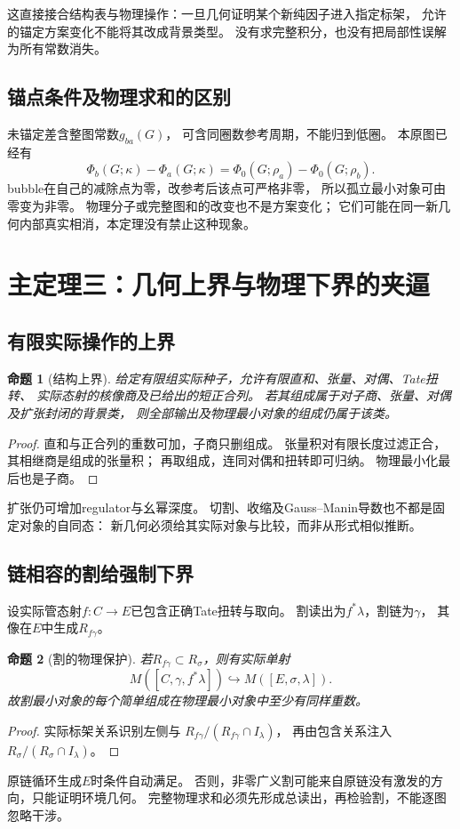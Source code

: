 \documentclass[11pt,a4paper]{ctexart}
\theoremstyle{cnplain}\newtheorem{theorem}{定理}[section]
\newtheorem{proposition}[theorem]{命题}
\theoremstyle{definition}\newtheorem{definition}[theorem]{定义}
\theoremstyle{remark}\newtheorem{remark}[theorem]{注}
\begin{document}
这直接接合结构表与物理操作：一旦几何证明某个新纯因子进入指定标架，
允许的锚定方案变化不能将其改成背景类型。
没有求完整积分，也没有把局部性误解为所有常数消失。

\subsection{锚点条件及物理求和的区别}
未锚定差含整图常数$g_{ba}(G)$，
可含同圈数参考周期，不能归到低圈。
本原图已经有
\[
 \Phi_b(G;\kappa)-\Phi_a(G;\kappa)
 =\Phi_0(G;\rho_a)-\Phi_0(G;\rho_b).
\]
bubble在自己的减除点为零，改参考后该点可严格非零，
所以孤立最小对象可由零变为非零。
物理分子或完整图和的改变也不是方案变化；
它们可能在同一新几何内部真实相消，本定理没有禁止这种现象。

\section{主定理三：几何上界与物理下界的夹逼}
\subsection{有限实际操作的上界}
\begin{proposition}[结构上界]\label{prop:upper}
给定有限组实际种子，允许有限直和、张量、对偶、Tate扭转、
实际态射的核像商及已给出的短正合列。
若其组成属于对子商、张量、对偶及扩张封闭的背景类，
则全部输出及物理最小对象的组成仍属于该类。
\end{proposition}
\begin{proof}
直和与正合列的重数可加，子商只删组成。
张量积对有限长度过滤正合，其相继商是组成的张量积；
再取组成，连同对偶和扭转即可归纳。
物理最小化最后也是子商。
\end{proof}
扩张仍可增加regulator与幺幂深度。
切割、收缩及Gauss--Manin导数也不都是固定对象的自同态：
新几何必须给其实际对象与比较，而非从形式相似推断。

\subsection{链相容的割给强制下界}
设实际管态射$f:C\to E$已包含正确Tate扭转与取向。
割读出为$f^*\lambda$，割链为$\gamma$，
其像在$E$中生成$R_{f\gamma}$。
\begin{proposition}[割的物理保护]\label{prop:lower}
若$R_{f\gamma}\subset R_\sigma$，则有实际单射
\[
 M([C,\gamma,f^*\lambda])\hookrightarrow M([E,\sigma,\lambda]).
\]
故割最小对象的每个简单组成在物理最小对象中至少有同样重数。
\end{proposition}
\begin{proof}
实际标架关系识别左侧与
$R_{f\gamma}/(R_{f\gamma}\cap I_\lambda)$，
再由包含关系注入$R_\sigma/(R_\sigma\cap I_\lambda)$。
\end{proof}
原链循环生成$E$时条件自动满足。
否则，非零广义割可能来自原链没有激发的方向，只能证明环境几何。
完整物理求和必须先形成总读出，再检验割，不能逐图忽略干涉。
\end{document}
